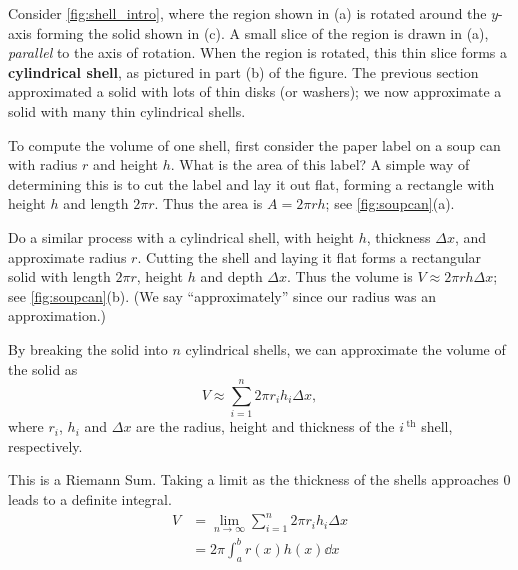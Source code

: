 Consider \autoref{fig:shell_intro}, where the region shown in (a) is rotated around the $y$-axis forming the solid shown in (c). A small slice of the region is drawn in (a), \emph{parallel} to the axis of rotation. When the region is rotated, this thin slice forms a \textbf{cylindrical shell}, as pictured in part (b) of the figure. The previous section approximated a solid with lots of thin disks (or washers); we now approximate a solid with many thin cylindrical shells.

To compute the volume of one shell, first consider the paper label on a soup can with radius $r$ and height $h$. What is the area of this label? A simple way of determining this is to cut the label and lay it out flat, forming a rectangle with height $h$ and length $2\pi r$. Thus the area is $A = 2\pi rh$; see \autoref{fig:soupcan}(a).

Do a similar process with a cylindrical shell, with height $h$, thickness $\Delta x$, and approximate radius $r$. Cutting the shell and laying it flat forms a rectangular solid with length $2\pi r$, height $h$ and depth $\Delta x$. Thus the volume is $V \approx 2\pi rh\Delta x$; see \autoref{fig:soupcan}(b). (We say ``approximately'' since our radius was an approximation.)

By breaking the solid into $n$ cylindrical shells, we can approximate the volume of the solid as
\[V \approx \sum_{i=1}^n 2\pi r_ih_i\Delta x,\]
where $r_i$, $h_i$ and $\Delta x$ are the radius, height and thickness of the $i\,^\text{th}$ shell, respectively. 

This is a Riemann Sum. Taking a limit as the thickness of the shells approaches 0 leads to a definite integral.
\begin{align*}
V&=\lim_{n\to \infty} \sum_{i=1}^n 2\pi r_i h_i \Delta x\\
&=2\pi \int_a^b r(x)h(x)\dd x
\end{align*}

